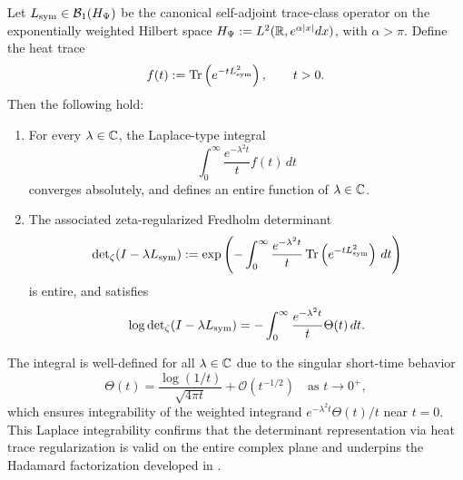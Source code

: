 \begin{lemma}
\label{lem:laplace_integrability_heat_trace}
Let \( L_{\mathrm{sym}} \in \mathcal{B}_1(H_{\Psi}) \) be the canonical self-adjoint trace-class operator on the exponentially weighted Hilbert space \( H_{\Psi} := L^2(\mathbb{R}, e^{\alpha|x|} dx) \), with \( \alpha > \pi \). Define the heat trace
\[
f(t) := \operatorname{Tr}\left(e^{-t L_{\mathrm{sym}}^2}\right), \qquad t > 0.
\]
Then the following hold:
\begin{enumerate}
    \item For every \( \lambda \in \mathbb{C} \), the Laplace-type integral
    \[
    \int_0^\infty \frac{e^{-\lambda^2 t}}{t} f(t)\, dt
    \]
    converges absolutely, and defines an entire function of \( \lambda \in \mathbb{C} \).
    
    \item The associated zeta-regularized Fredholm determinant
    \[
    \det\nolimits_{\zeta}(I - \lambda L_{\mathrm{sym}}) := \exp\left( -\int_0^\infty \frac{e^{-\lambda^2 t}}{t} \operatorname{Tr}\left(e^{-t L_{\mathrm{sym}}^2}\right) \, dt \right)
    \]
    is entire, and satisfies
    \[
    \log \det\nolimits_{\zeta}(I - \lambda L_{\mathrm{sym}}) = - \int_0^\infty \frac{e^{-\lambda^2 t}}{t} \Theta(t)\, dt.
    \]
\end{enumerate}

\noindent
The integral is well-defined for all \( \lambda \in \mathbb{C} \) due to the singular short-time behavior
\[
\Theta(t) = \frac{\log(1/t)}{\sqrt{4\pi t}} + \mathcal{O}(t^{-1/2}) \quad \text{as } t \to 0^+,
\]
which ensures integrability of the weighted integrand \( e^{-\lambda^2 t} \Theta(t)/t \) near \( t = 0 \). This Laplace integrability confirms that the determinant representation via heat trace regularization is valid on the entire complex plane and underpins the Hadamard factorization developed in .
\end{lemma}
